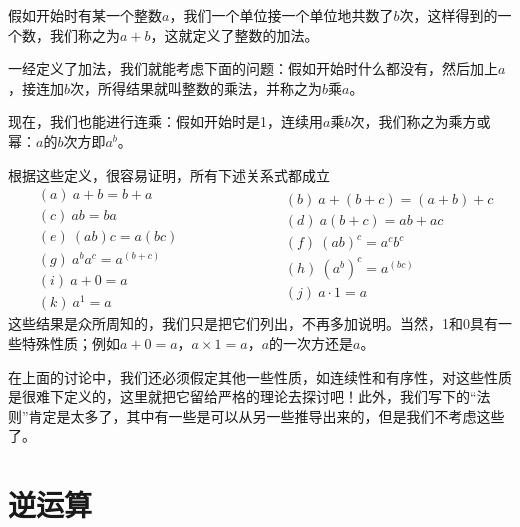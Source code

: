 假如开始时有某一个整数$a$，我们一个单位接一个单位地共数了$b$次，这样得到的一个数，我们称之为$a+b$，这就定义了整数的加法。

一经定义了加法，我们就能考虑下面的问题：假如开始时什么都没有，然后加上$a$，接连加$b$次，所得结果就叫整数的乘法，并称之为$b$乘$a$。

现在，我们也能进行连乘：假如开始时是1，连续用$a$乘$b$次，我们称之为乘方或幂：$a$的$b$次方即$a^b$。

根据这些定义，很容易证明，所有下述关系式都成立
\begin{equation}
    \label{Eq:I:22:1}
    \begin{aligned}
        &(a)~a+b=b+a \\
        &(c)~ab=ba \\
        &(e)~(ab)c=a(bc) \\ 
        &(g)~a^ba^c=a^{(b+c)} \\ 
        &(i)~a + 0 = a \\
        &(k)~a^1=a
    \end{aligned}
    \qquad\qquad\qquad
    \begin{aligned}
        &(b)~a+(b+c)=(a+b)+c \\
        &(d)~a(b+c)=ab+ac \\
        &(f)~(ab)^c = a^cb^c \\
        &(h)~(a^b)^c=a^{(bc)} \\
        &(j)~a \cdot 1 = a \\
        &
    \end{aligned}
\end{equation}
这些结果是众所周知的，我们只是把它们列出，不再多加说明。当然，1和0具有一些特殊性质；例如$a+0=a$，$a \times 1=a$，$a$的一次方还是$a$。

在上面的讨论中，我们还必须假定其他一些性质，如连续性和有序性，对这些性质是很难下定义的，这里就把它留给严格的理论去探讨吧！此外，我们写下的“法则”肯定是太多了，其中有一些是可以从另一些推导出来的，但是我们不考虑这些了。

\section{逆运算}

